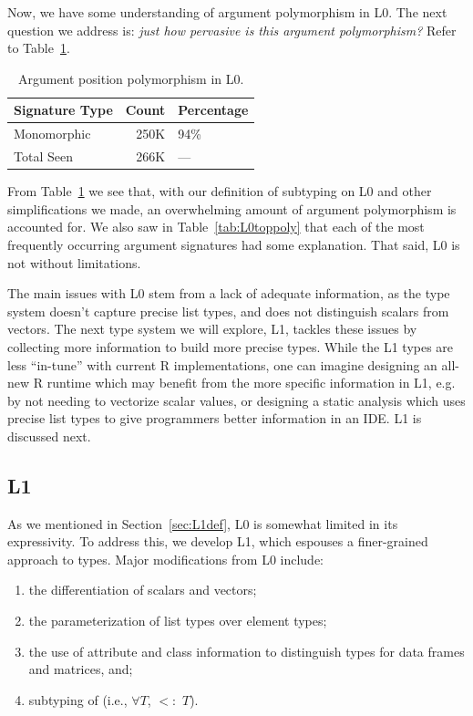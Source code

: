\documentclass[acmsmall,10pt,review,anonymous]{acmart}\settopmatter{printfolios=true,printccs=false,printacmref=false}
\begin{document}
Now, we have some understanding of argument polymorphism in L0.
The next question we address is: {\it just how pervasive is this argument polymorphism?}
Refer to Table~\ref{tab:L0argcounts}.

\begin{table}[ht]\label{tab:L0argcounts}\centering
\begin{tabular}{lrl}
  \hline
Signature Type & Count & Percentage \\ 
  \hline
  Monomorphic & 250K & 94\% \\ 
  Total Seen & 266K & --- \\ 
   \hline
\end{tabular}
\caption{Argument position polymorphism in L0.}
\end{table}

From Table~\ref{tab:L0argcounts} we see that, with our definition of subtyping on L0 and other simplifications we made, an overwhelming amount of argument polymorphism is accounted for.
We also saw in Table~\ref{tab:L0toppoly} that each of the most frequently occurring argument signatures had some explanation.
That said, L0 is not without limitations.

The main issues with L0 stem from a lack of adequate information, as the type system doesn't capture precise list types, and does not distinguish scalars from vectors.
The next type system we will explore, L1, tackles these issues by collecting more information to build more precise types.
While the L1 types are less ``in-tune'' with current R implementations, one can imagine designing an all-new R runtime which may benefit from the more specific information in L1, e.g. by not needing to vectorize scalar values, or designing a static analysis which uses precise list types to give programmers better information in an IDE.
L1 is discussed next.


%
%
%
%
\subsection{L1}

As we mentioned in Section~\ref{sec:L1def}, L0 is somewhat limited in its expressivity. 
To address this, we develop L1, which espouses a finer-grained approach to types. 
Major modifications from L0 include:

\begin{enumerate}
	\item the differentiation of scalars and vectors;
	\item the parameterization of list types over element types;
	\item the use of attribute and class information to distinguish types for data frames and matrices, and;
	\item subtyping of \sN (i.e., $\forall T$, \sN $<:$ $T$).
\end{enumerate}
\end{document}
